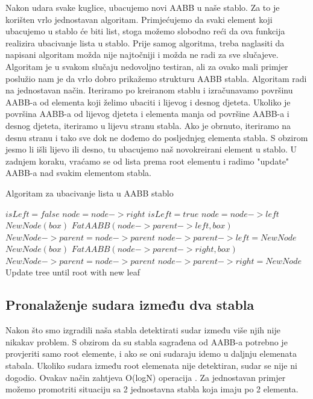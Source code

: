 Nakon udara svake kuglice, ubacujemo novi AABB u naše stablo. Za to je korišten vrlo jednostavan algoritam. Primjećujemo da svaki element koji ubacujemo u stablo će biti list, stoga možemo slobodno reći da ova funkcija realizira ubacivanje lista u stablo\cite{6}. Prije samog algoritma, treba naglasiti da napisani algoritam možda nije najtočniji i možda ne radi za sve slučajeve. Algoritam je u svakom slučaju nedovoljno testiran, ali za ovako mali primjer poslužio nam je da vrlo dobro prikažemo strukturu AABB stabla. Algoritam radi na jednostavan način. Iteriramo po kreiranom stablu i izračunavamo površinu AABB-a od elementa koji želimo ubaciti i lijevog i desnog djeteta. Ukoliko je površina AABB-a od lijevog djeteta i elementa manja od površine AABB-a i desnog djeteta, iteriramo u lijevu stranu stabla. Ako je obrnuto, iteriramo na desnu stranu i tako sve dok ne dođemo do posljednjeg elementa stabla\cite{6}. S obzirom jesmo li išli lijevo ili desno, tu ubacujemo naš novokreirani element u stablo. U zadnjem koraku, vraćamo se od lista prema root elementu i radimo "update" AABB-a nad svakim elementom stabla.\newpage
\begin{algorithm}
	\caption{Algoritam za ubacivanje lista u AABB stablo}
	\label{alg:leaf_insertion}
	\begin{algorithmic}
		 \State $isLeft = false$
		\State $node = node->right$
		\Else
		\State $isLeft = true$
		\State $node = node->left$
		\EndIf
		\EndWhile
		\State $NewNode(box)$
		\State $FatAABB(node->parent->left, box)$
		\State $NewNode->parent = node->parent$
		\State $node->parent->left = NewNode$
		\Else
		\State $NewNode(box)$
		\State $FatAABB(node->parent->right, box)$
		\State $NewNode->parent = node->parent$
		\State $node->parent->right = NewNode$
		\EndIf
		\State Update tree until root with new leaf
		\EndFunction
	\end{algorithmic}
\end{algorithm}\newpage

\subsection{Pronalaženje sudara između dva stabla}
Nakon što smo izgradili naša stabla detektirati sudar između više njih nije nikakav problem. S obzirom da su stabla sagrađena od AABB-a potrebno je provjeriti samo root elemente, i ako se oni sudaraju idemo u daljnju elemenata stabala. Ukoliko sudara između root elemenata nije detektiran, sudar se nije ni dogodio. Ovakav način zahtjeva O(logN) operacija \cite{1}. Za jednostavan primjer možemo promotriti situaciju sa 2 jednostavna stabla koja imaju po 2 elementa. 

